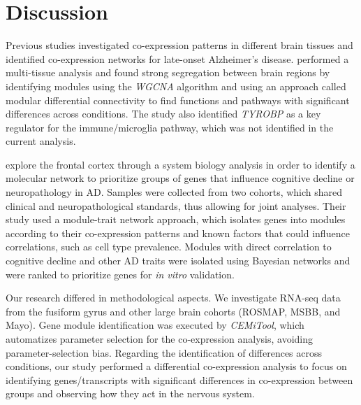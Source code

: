 \documentclass[utf8]{FrontiersinHarvard} %
\begin{document}


\section{Discussion}

Previous studies investigated co-expression patterns in different brain tissues and identified co-expression networks for late-onset Alzheimer's disease. \citet{zhang2013integrated} performed a multi-tissue analysis and found strong segregation between brain regions by identifying modules using the \textit{WGCNA} algorithm and using an approach called modular differential connectivity to find functions and pathways with significant differences across conditions. The study also identified \textit{TYROBP} as a key regulator for the immune/microglia pathway, which was not identified in the current analysis. 

\citet{mostafavi2018molecular} explore the frontal cortex through a system biology analysis in order to identify a molecular network to prioritize groups of genes that influence cognitive decline or neuropathology in AD. Samples were collected from two cohorts, which shared clinical and neuropathological standards, thus allowing for joint analyses. Their study used a module-trait network approach, which isolates genes into modules according to their co-expression patterns and known factors that could influence correlations, such as cell type prevalence. Modules with direct correlation to cognitive decline and other AD traits were isolated using Bayesian networks and were ranked to prioritize genes for \textit{in vitro} validation.

Our research differed in methodological aspects. We investigate RNA-seq data from the fusiform gyrus and other large brain cohorts (ROSMAP, MSBB, and Mayo). Gene module identification was executed by \textit{CEMiTool}, which automatizes parameter selection for the co-expression analysis, avoiding parameter-selection bias. Regarding the identification of differences across conditions, our study performed a differential co-expression analysis to focus on identifying genes/transcripts with significant differences in co-expression between groups and observing how they act in the nervous system.
\end{document}
